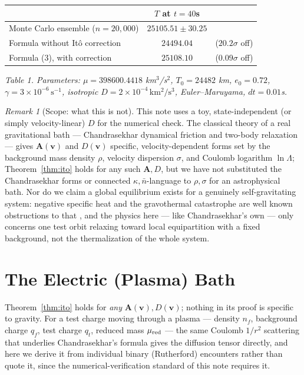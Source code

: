 \documentclass[12pt]{amsart}
\theoremstyle{plain}
\theoremstyle{remark}
\newtheorem*{remark}{Remark}
\begin{document}
\begin{center}
\begin{tabular}{lcc}
\hline
& $T$ at $t=40$s & \\
\hline
Monte Carlo ensemble ($n=20{,}000$) & $25105.51\pm30.25$ & \\
Formula without It\^o correction & $24494.04$ & ($20.2\sigma$ off) \\
Formula (3), with correction & $25108.10$ & ($0.09\sigma$ off) \\
\hline
\end{tabular}
\end{center}
\emph{Table 1. Parameters: $\mu=398600.4418$ km$^3$/s$^2$, $T_0=24482$ km, $e_0=0.72$, $\gamma=3\times10^{-6}\,\mathrm{s}^{-1}$, isotropic $D=2\times10^{-4}\,\mathrm{km^2/s^3}$, Euler--Maruyama, $dt=0.01$s.}

\begin{remark}[Scope: what this is not]
This note uses a toy, state-independent (or simply velocity-linear) $D$ for the numerical check. The classical theory of a real gravitational bath --- Chandrasekhar dynamical friction and two-body relaxation \cite{Chandrasekhar1943,BinneyTremaine2008} --- gives $\mathbf A(\mathbf v)$ and $D(\mathbf v)$ specific, velocity-dependent forms set by the background mass density $\rho$, velocity dispersion $\sigma$, and Coulomb logarithm $\ln\Lambda$; Theorem~\ref{thm:ito} holds for any such $\mathbf A,D$, but we have not substituted the Chandrasekhar forms or connected $\kappa,\bar n$-language to $\rho,\sigma$ for an astrophysical bath. Nor do we claim a global equilibrium exists for a genuinely self-gravitating system: negative specific heat and the gravothermal catastrophe are well known obstructions to that \cite{BinneyTremaine2008}, and the physics here --- like Chandrasekhar's own --- only concerns one test orbit relaxing toward local equipartition with a fixed background, not the thermalization of the whole system.
\end{remark}

\section{The Electric (Plasma) Bath}

Theorem~\ref{thm:ito} holds for \emph{any} $\mathbf A(\mathbf v),D(\mathbf v)$; nothing in its proof is specific to gravity. For a test charge moving through a plasma --- density $n_f$, background charge $q_f$, test charge $q_t$, reduced mass $\mu_{\rm red}$ --- the same Coulomb $1/r^2$ scattering that underlies Chandrasekhar's formula gives the diffusion tensor directly, and here we derive it from individual binary (Rutherford) encounters rather than quote it, since the numerical-verification standard of this note requires it.
\end{document}
